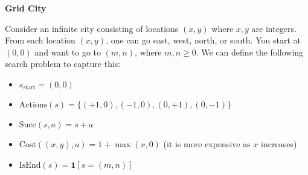 \item {\bf Grid City}

Consider an infinite city consisting of locations $(x,y)$ where $x, y$ are integers. From each location $(x,y)$, one can go east, west, north, or south. You start at $(0,0)$ and want to go to $(m, n)$, where $m, n \geq 0$. We can define the following search problem to capture this:

\begin{itemize}
  \item $s_\text{start} = (0,0)$
  \item $\text{Actions}(s) = \{ (+1, 0), (-1, 0), (0, +1), (0, -1) \}$
  \item $\text{Succ}(s, a) = s + a$
  \item $\text{Cost}((x,y), a) = 1 + \max(x, 0)$ (it is more expensive as $x$ increases)
  \item $\text{IsEnd}(s) = \mathbf{1}[s = (m,n)]$
\end{itemize}

\begin{enumerate}

  

  

  

\end{enumerate}
